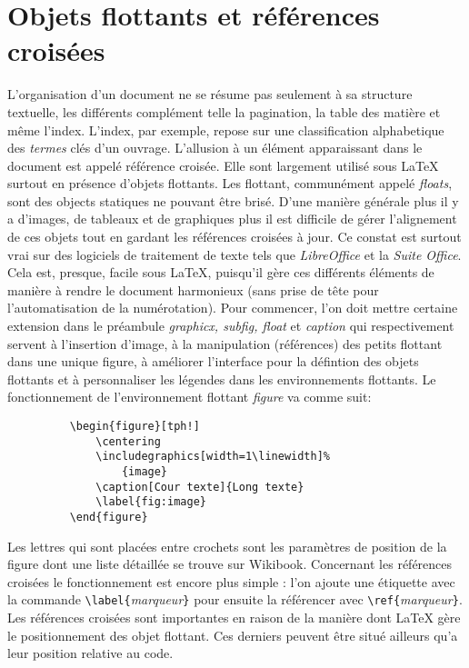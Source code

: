 \section{Objets flottants et références croisées}
L'organisation d'un document ne se résume pas seulement à sa structure textuelle, les différents complément telle la pagination, la table des matière et même l'index. L'index, par exemple, repose sur une classification alphabetique des \textit{termes}\footnotemark{} clés d'un ouvrage. L'allusion à un élément apparaissant dans le document est appelé référence croisée. Elle sont largement utilisé sous \LaTeX{} surtout en présence d'objets flottants. Les flottant, communément appelé \textit{floats}, sont des objects statiques ne pouvant être \og brisé\fg{}. D'une manière générale plus il y a d'images, de tableaux et de graphiques plus il est difficile de gérer l'alignement de ces objets tout en gardant les références croisées à jour.
Ce constat est surtout vrai sur des logiciels de traitement de texte tels que \textit{LibreOffice} et la \textit{Suite Office}. Cela est, presque, facile sous \LaTeX, puisqu'il gère ces différents éléments de manière à rendre le document harmonieux (sans prise de tête pour l'automatisation de la numérotation). Pour commencer, l'on doit mettre certaine extension dans le préambule \textit{graphicx, subfig, float} et \textit{caption} qui respectivement servent à l'insertion d'image, à la manipulation (références) des \og petits \fg{} flottant dans une unique figure, à améliorer l'interface pour la défintion des objets flottants et à personnaliser les légendes dans les environnements flottants. Le fonctionnement de l'environnement flottant \textit{figure} va comme suit:
\begin{figure}[tph!]
	\begin{verbatim}
	\begin{figure}[tph!]
	    \centering
	    \includegraphics[width=1\linewidth]%
	        {image}
	    \caption[Cour texte]{Long texte}
	    \label{fig:image}
	\end{figure}
	\end{verbatim}
\end{figure}\linebreak
%
Les lettres qui sont placées entre crochets sont les paramètres de position de la figure dont une liste détaillée se trouve sur Wikibook\footnotemark {}. Concernant les références croisées le fonctionnement est encore plus simple : l'on ajoute une étiquette avec la commande \verb|\label{|\textit{marqueur}\verb|}| pour ensuite la référencer avec \verb|\ref{|\textit{marqueur}\verb|}|. Les références croisées sont importantes en raison de la manière dont \LaTeX{} gère le positionnement des objet flottant. Ces derniers peuvent être situé ailleurs qu'a leur position relative au code. 
